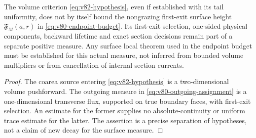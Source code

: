 \begin{proposition}
\label{prop:v82-surface-independent}
The volume criterion \eqref{eq:v82-hypothesis}, even if established
with its tail uniformity, does not by itself bound the nongrazing
first-exit surface height $\mathfrak F_M(a,r)$ in
\eqref{eq:v80-endpoint-budget}. Its first-exit selection,
one-sided physical components, backward lifetime and exact section
decisions remain part of a separate positive measure. Any
surface local theorem used in the endpoint budget must be
established for this actual measure, not inferred from bounded
volume multipliers or from cancellation of internal section currents.
\end{proposition}
\begin{proof}
The coarea source entering \eqref{eq:v82-hypothesis} is a
two-dimensional volume pushforward. The outgoing measure in
\eqref{eq:v80-outgoing-assignment} is a one-dimensional transverse
flux, supported on true boundary faces, with first-exit selection.
An estimate for the former supplies no absolute-continuity or
uniform trace estimate for the latter. The assertion is a precise
separation of hypotheses, not a claim of new decay for the surface
measure.
\end{proof}
